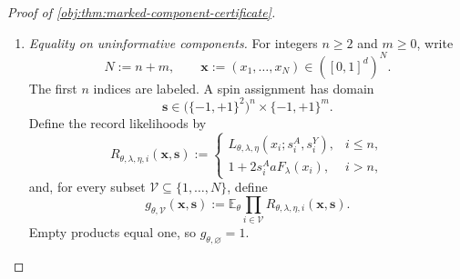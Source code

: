 \begin{proof}[Proof of \cref{obj:thm:marked-component-certificate}]
\begin{enumerate}
The sine-cosine identity on each lattice interval gives a sum of squares equal to one. Tensoring it and multiplying by \(B_h^2\) yields
\[
\sum_{\mathbf z\in\mathcal I}\phi_{\mathbf z}(x)^2=B_h(x)^2.
\]
For \(x\in C_h\), all nonzero tensor entries lie in the prescribed finite index set; for \(x\notin C_h\), both sides vanish. Expanding the finite signed sums therefore gives
\[
\mathbb E_\theta F_\lambda(x)
=
\mathbb E_\theta G_\eta(x)=0,
\qquad
\mathbb E_\theta[F_\lambda(x)G_\eta(x)]
=\frac{\theta}{2}B_h(x)^2.
\]

Set
\[
c_S:=\frac1{64D_d}.
\]
If the amplitude inequalities hold with \(c_S\), then
\[
a,b\le c_S,\qquad
aD_d,bD_d\le\frac1{64},
\qquad
ab\le\frac1{4096}.
\]
Thus the raw propensity and both raw arm probabilities lie in \([0,1]\), at every covariate, so their Bernoulli atom formulas apply directly.

For a labeled record, define the treatment and observed-response spins by
\[
s^A:=2A-1,\qquad
Y:=AY(1)+(1-A)Y(0),\qquad
s^Y:=2Y-1.
\]
Relative to the uniform probability measure on the four spin pairs, its likelihood is
\[
L_{\theta,\lambda,\eta}(x;s^A,s^Y)
:=
(1+2s^AaF_\lambda(x))
(1+2s^YbG_\eta(x)+s^As^Y\tau_\theta(x)).
\]
This follows by multiplying the two Bernoulli atom probabilities, each divided by its fair atom probability. Expanding the product gives
\[
\begin{aligned}
\mathbb E_\theta L_{\theta,\lambda,\eta}(x;s^A,s^Y)
={}&1+s^As^Y\tau_\theta(x)\\
&+\bigl(2s^Aa+2(s^A)^2s^Ya\tau_\theta(x)\bigr)
  \mathbb E_\theta F_\lambda(x)\\
&+2s^Yb\,\mathbb E_\theta G_\eta(x)
+4s^As^Yab\,\mathbb E_\theta[F_\lambda(x)G_\eta(x)]\\
={}&1+s^As^Y
\bigl(-2\theta abB_h(x)^2+2\theta abB_h(x)^2\bigr)
=1.
\end{aligned}
\]
Hence every atom of the singleton labeled mixture has probability \(1/4\). This proves its uniform conditional law for every hypothesis and every cube covariate.

\item \textit{Equality on uninformative components.}
For integers \(n\ge2\) and \(m\ge0\), write
\[
N:=n+m,\qquad
\mathbf x:=(x_1,\ldots,x_N)\in([0,1]^d)^N.
\]
The first \(n\) indices are labeled. A spin assignment has domain
\[
\mathbf s\in
\bigl(\{-1,+1\}^2\bigr)^n
\times\{-1,+1\}^m.
\]
Define the record likelihoods by
\[
R_{\theta,\lambda,\eta,i}(\mathbf x,\mathbf s)
:=
\begin{cases}
L_{\theta,\lambda,\eta}(x_i;s_i^A,s_i^Y),&i\le n,\\
1+2s_i^AaF_\lambda(x_i),&i>n,
\end{cases}
\]
and, for every subset \(\mathcal V\subseteq\{1,\ldots,N\}\), define
\[
g_{\theta,\mathcal V}(\mathbf x,\mathbf s)
:=
\mathbb E_\theta
\prod_{i\in\mathcal V}
R_{\theta,\lambda,\eta,i}(\mathbf x,\mathbf s).
\]
Empty products equal one, so \(g_{\theta,\varnothing}=1\).


\end{enumerate}
\end{proof}
